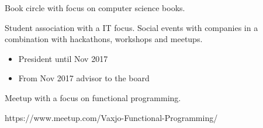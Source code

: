\documentclass[10pt,a4paper,ragged2e,withhyper]{altacv}
\begin{document}
\begin{paracol}{2}





\newpage



Book circle with focus on computer science books.

\divider


Student association with a IT focus. Social events with companies in a combination
with hackathons, workshops and meetups.

\begin{itemize}
\item President until Nov 2017
\item From Nov 2017 advisor to the board
\end{itemize}

\divider


Meetup with a focus on functional programming.

https://www.meetup.com/Vaxjo-Functional-Programming/

\medskip





\end{paracol}
\end{document}
